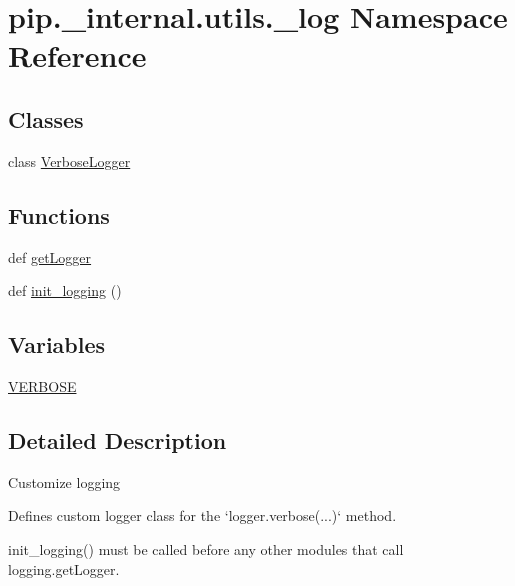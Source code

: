 \hypertarget{namespacepip_1_1__internal_1_1utils_1_1__log}{}\section{pip.\+\_\+internal.\+utils.\+\_\+log Namespace Reference}
\label{namespacepip_1_1__internal_1_1utils_1_1__log}
\subsection*{Classes}
\begin{DoxyCompactItemize}
\item 
class \hyperlink{classpip_1_1__internal_1_1utils_1_1__log_1_1VerboseLogger}{Verbose\+Logger}
\end{DoxyCompactItemize}
\subsection*{Functions}
\begin{DoxyCompactItemize}
\item 
def \hyperlink{namespacepip_1_1__internal_1_1utils_1_1__log_a4e99fc0a88ebcc9c00f60c8d0d1394f9}{get\+Logger}
\item 
def \hyperlink{namespacepip_1_1__internal_1_1utils_1_1__log_aa96252bd23c82602cde80c73a84a88cb}{init\+\_\+logging} ()
\end{DoxyCompactItemize}
\subsection*{Variables}
\begin{DoxyCompactItemize}
\item 
\hyperlink{namespacepip_1_1__internal_1_1utils_1_1__log_a08cf4589fc60a5069bfe5028057085d0}{V\+E\+R\+B\+O\+SE}
\end{DoxyCompactItemize}


\subsection{Detailed Description}
\begin{DoxyVerb}Customize logging

Defines custom logger class for the `logger.verbose(...)` method.

init_logging() must be called before any other modules that call logging.getLogger.
\end{DoxyVerb}
 

